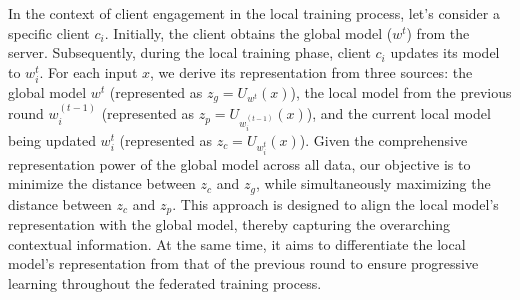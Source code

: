 In the context of client engagement in the local training process, let's consider a specific client $c_i$. Initially, the client obtains the global model ($w^t$) from the server. Subsequently, during the local training phase, client $c_i$ updates its model to $w^t_i$. For each input $x$, we derive its representation from three sources: the global model $w^t$ (represented as $z_g = U_{w^t}(x)$), the local model from the previous round $w^{(t-1)}_i$ (represented as $z_p = U_{w^{(t-1)}_i}(x)$), and the current local model being updated $w^{t}_i$ (represented as $z_c = U_{w^{t}_i}(x)$). Given the comprehensive representation power of the global model across all data, our objective is to minimize the distance between $z_c$ and $z_g$, while simultaneously maximizing the distance between $z_c$ and $z_p$. This approach is designed to align the local model's representation with the global model, thereby capturing the overarching contextual information. At the same time, it aims to differentiate the local model's representation from that of the previous round to ensure progressive learning throughout the federated training process.

